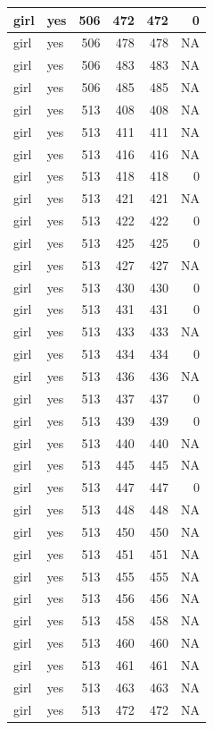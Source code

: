 \documentclass[man]{apa6}
\begin{document}
\begin{tabular}{l|l|r|r|r|r}
\hline
girl & yes & 506 & 472 & 472 & 0\\
\hline
girl & yes & 506 & 478 & 478 & NA\\
\hline
girl & yes & 506 & 483 & 483 & NA\\
\hline
girl & yes & 506 & 485 & 485 & NA\\
\hline
girl & yes & 513 & 408 & 408 & NA\\
\hline
girl & yes & 513 & 411 & 411 & NA\\
\hline
girl & yes & 513 & 416 & 416 & NA\\
\hline
girl & yes & 513 & 418 & 418 & 0\\
\hline
girl & yes & 513 & 421 & 421 & NA\\
\hline
girl & yes & 513 & 422 & 422 & 0\\
\hline
girl & yes & 513 & 425 & 425 & 0\\
\hline
girl & yes & 513 & 427 & 427 & NA\\
\hline
girl & yes & 513 & 430 & 430 & 0\\
\hline
girl & yes & 513 & 431 & 431 & 0\\
\hline
girl & yes & 513 & 433 & 433 & NA\\
\hline
girl & yes & 513 & 434 & 434 & 0\\
\hline
girl & yes & 513 & 436 & 436 & NA\\
\hline
girl & yes & 513 & 437 & 437 & 0\\
\hline
girl & yes & 513 & 439 & 439 & 0\\
\hline
girl & yes & 513 & 440 & 440 & NA\\
\hline
girl & yes & 513 & 445 & 445 & NA\\
\hline
girl & yes & 513 & 447 & 447 & 0\\
\hline
girl & yes & 513 & 448 & 448 & NA\\
\hline
girl & yes & 513 & 450 & 450 & NA\\
\hline
girl & yes & 513 & 451 & 451 & NA\\
\hline
girl & yes & 513 & 455 & 455 & NA\\
\hline
girl & yes & 513 & 456 & 456 & NA\\
\hline
girl & yes & 513 & 458 & 458 & NA\\
\hline
girl & yes & 513 & 460 & 460 & NA\\
\hline
girl & yes & 513 & 461 & 461 & NA\\
\hline
girl & yes & 513 & 463 & 463 & NA\\
\hline
girl & yes & 513 & 472 & 472 & NA\\

\end{tabular}
\end{document}
